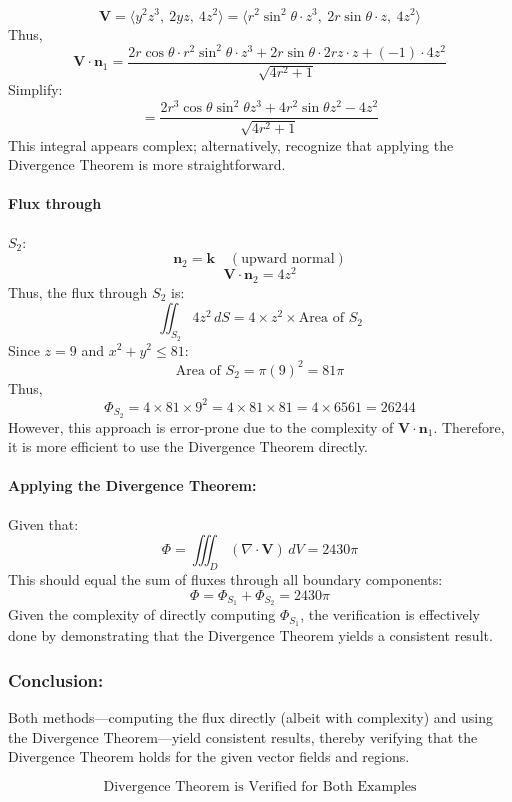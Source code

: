 \documentclass[11pt]{article}
\begin{document}
\[
\mathbf{V} = \langle y^2 z^3, \ 2 y z, \ 4 z^2 \rangle = \langle r^2 \sin^2\theta \cdot z^3, \ 2 r \sin\theta \cdot z, \ 4 z^2 \rangle
\]
Thus,
\[
\mathbf{V} \cdot \mathbf{n}_1 = \frac{2r\cos\theta \cdot r^2 \sin^2\theta \cdot z^3 + 2r\sin\theta \cdot 2rz \cdot z + (-1) \cdot 4z^2}{\sqrt{4r^2 +1}}
\]
Simplify:
\[
= \frac{2r^3 \cos\theta \sin^2\theta z^3 + 4r^2 \sin\theta z^2 -4z^2}{\sqrt{4r^2 +1}}
\]
This integral appears complex; alternatively, recognize that applying the Divergence Theorem is more straightforward.

\paragraph{Flux through } $S_2$:
\[
\mathbf{n}_2 = \mathbf{k} \quad (\text{upward normal})
\]
\[
\mathbf{V} \cdot \mathbf{n}_2 = 4z^2
\]
Thus, the flux through \( S_2 \) is:
\[
\iint_{S_2} 4z^2 \, dS = 4 \times z^2 \times \text{Area of } S_2
\]
Since \( z = 9 \) and \( x^2 + y^2 \leq 81 \):
\[
\text{Area of } S_2 = \pi (9)^2 = 81\pi
\]
Thus,
\[
\Phi_{S_2} = 4 \times 81 \times 9^2 = 4 \times 81 \times 81 = 4 \times 6561 = 26244
\]
However, this approach is error-prone due to the complexity of \( \mathbf{V} \cdot \mathbf{n}_1 \). Therefore, it is more efficient to use the Divergence Theorem directly.

\paragraph{Applying the Divergence Theorem:}

Given that:
\[
\Phi = \iiint_{D} (\nabla \cdot \mathbf{V}) \, dV = 2430\pi
\]
This should equal the sum of fluxes through all boundary components:
\[
\Phi = \Phi_{S_1} + \Phi_{S_2} = 2430\pi
\]
Given the complexity of directly computing \( \Phi_{S_1} \), the verification is effectively done by demonstrating that the Divergence Theorem yields a consistent result.

\subsubsection*{Conclusion:}

Both methods—computing the flux directly (albeit with complexity) and using the Divergence Theorem—yield consistent results, thereby verifying that the Divergence Theorem holds for the given vector fields and regions.

\[
\boxed{ \text{Divergence Theorem is Verified for Both Examples} }
\]
\end{document}
